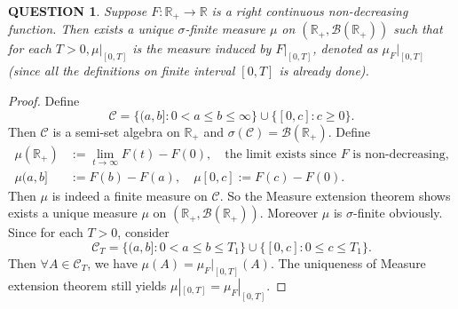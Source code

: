 \documentclass[12pt]{article}
\renewcommand{\b}{\mathscr{B}}
\renewcommand{\(}{\left(}%
\renewcommand{\)}{\right)}%
\renewcommand{\[}{\left[}%
\renewcommand{\]}{\right]}%
\renewcommand{\r}{\mathbb{R}}
\newtheorem{question}{QUESTION}[section]}
\newtheorem{proof}{Proof.}}
\begin{document}
  \begin{question}
   Suppose $F:\r_+\to \r$ is a right continuous non-decreasing function. Then exists a unique $\sigma$-finite measure $\mu$ on $(\r_+,\b(\r_+))$ such that for each $T>0,\mu|_{[0,T]}$ is the measure induced by $F|_{[0,T]}$, denoted as $\mu_F|_{[0,T]}$ (since all the definitions on finite interval $[0,T]$ is already done).
  \end{question}
  \begin{proof}Define
   \begin{equation*}
    \mathscr{C}=\{(a,b]:0<a\leq b\leq \infty \}\cup\{[0,c]:c\geq 0\}.
   \end{equation*}
   Then $\mathscr{C}$ is a semi-set algebra on $\r_+$ and $\sigma(\mathscr{C})=\b(\r_+)$. Define
   \begin{equation*}
    \begin{split}
     \mu(\r_+)&:=\lim_{t\to\infty}F(t)-F(0),\quad \text{the limit exists since $F$ is non-decreasing,}\\
     \mu(a,b]&:=F(b)-F(a),\quad \mu[0,c]:=F(c)-F(0).
    \end{split}
   \end{equation*}
   Then $\mu$ is indeed a finite measure on $\mathscr{C}$. So the {\sffamily Measure extension theorem} shows exists a unique measure $\mu$ on $(\r_+,\b(\r_+))$. Moreover $\mu$ is $\sigma$-finite obviously. Since for each $T>0$, consider
   \begin{equation*}
    \mathscr{C}_T=\{(a,b]:0<a\leq b\leq T_1\}\cup\{[0,c]:0\leq c\leq T_1\}.
   \end{equation*}
    Then $\forall A\in\mathscr{C}_T$, we have $\mu(A)=\mu_{F}|_{[0,T]}(A)$. The uniqueness of {\sffamily Measure extension theorem} still yields $\mu|_{[0,T]}=\mu_{F}|_{[0,T]}$.
  \end{proof}
\end{document}
